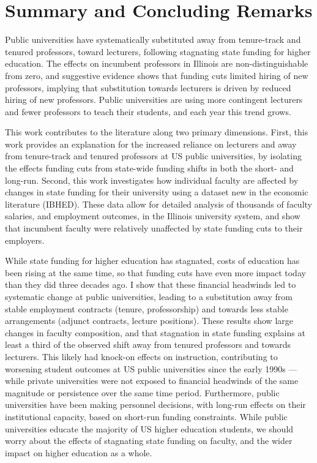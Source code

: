 \section{Summary and Concluding Remarks}
\label{sec:conclusion}
Public universities have systematically substituted away from tenure-track and tenured professors, toward lecturers, following stagnating state funding for higher education.
The effects on incumbent professors in Illinois are non-distinguishable from zero, and suggestive evidence shows that funding cuts limited hiring of new professors, implying that substitution towards lecturers is driven by reduced hiring of new professors.
Public universities are using more contingent lecturers and fewer professors to teach their students, and each year this trend grows.

This work contributes to the literature along two primary dimensions.
First, this work provides an explanation for the increased reliance on lecturers and away from tenure-track and tenured professors at US public universities, by isolating the effects funding cuts from state-wide funding shifts in both the short- and long-run.
Second, this work investigates how individual faculty are affected by changes in state funding for their university using a dataset new in the economic literature (IBHED).
These data allow for detailed analysis of thousands of faculty salaries, and employment outcomes, in the Illinois university system, and show that incumbent faculty were relatively unaffected by state funding cuts to their employers.

While state funding for higher education has stagnated, costs of education has been rising at the same time, so that funding cuts have even more impact today than they did three decades ago.
I show that these financial headwinds led to systematic change at public universities, leading to a substitution away from stable employment contracts (tenure, professorship) and towards less stable arrangements (adjunct contracts, lecture positions).
These results show large changes in faculty composition, and that stagnation in state funding explains at least a third of the observed shift away from tenured professors and towards lecturers.
This likely had knock-on effects on instruction, contributing to worsening student outcomes at US public universities since the early 1990s --- while private universities were not exposed to financial headwinds of the same magnitude or persistence over the same time period.
Furthermore, public universities have been making personnel decisions, with long-run effects on their institutional capacity, based on short-run funding constraints.
While public universities educate the majority of US higher education students, we should worry about the effects of stagnating state funding on faculty, and the wider impact on higher education as a whole.

